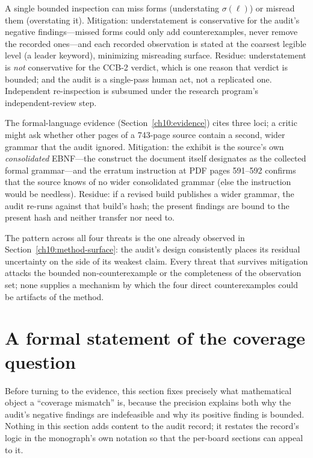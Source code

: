 \begin{threat}\label{ch10:threat-observer}
A single bounded inspection can miss forms (understating $\sigma(\ell)$) or misread them (overstating it). Mitigation: understatement is conservative for the audit's negative findings---missed forms could only add counterexamples, never remove the recorded ones---and each recorded observation is stated at the coarsest legible level (a leader keyword), minimizing misreading surface. Residue: understatement is \emph{not} conservative for the CCB-2 verdict, which is one reason that verdict is bounded; and the audit is a single-pass human act, not a replicated one. Independent re-inspection is subsumed under the research program's independent-review step.
\end{threat}

\begin{threat}\label{ch10:threat-selection}
The formal-language evidence (Section~\ref{ch10:evidence}) cites three loci; a critic might ask whether other pages of a 743-page source contain a second, wider grammar that the audit ignored. Mitigation: the exhibit is the source's own \emph{consolidated} EBNF---the construct the document itself designates as the collected formal grammar---and the erratum instruction at PDF pages 591--592 confirms that the source knows of no wider consolidated grammar (else the instruction would be needless). Residue: if a revised build publishes a wider grammar, the audit re-runs against that build's hash; the present findings are bound to the present hash and neither transfer nor need to.
\end{threat}

The pattern across all four threats is the one already observed in Section~\ref{ch10:method-surface}: the audit's design consistently places its residual uncertainty on the side of its weakest claim. Every threat that survives mitigation attacks the bounded non-counterexample or the completeness of the observation set; none supplies a mechanism by which the four direct counterexamples could be artifacts of the method.

\section{A formal statement of the coverage question}\label{ch10:formal}

Before turning to the evidence, this section fixes precisely what mathematical object a ``coverage mismatch'' is, because the precision explains both why the audit's negative findings are indefeasible and why its positive finding is bounded. Nothing in this section adds content to the audit record; it restates the record's logic in the monograph's own notation so that the per-board sections can appeal to it.

